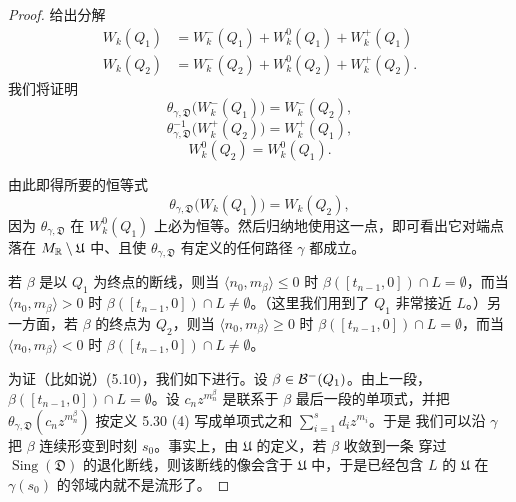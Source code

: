 \begin{proof}
给出分解
\begin{align*}
W_k(Q_1) &= W^-_k(Q_1)+W^0_k(Q_1)+W^+_k(Q_1)\\
W_k(Q_2) &= W^-_k(Q_2)+W^0_k(Q_2)+W^+_k(Q_2).
\end{align*}
我们将证明
\begin{equation}
\theta_{\gamma,\mathfrak D}\bigl(W^-_k(Q_1)\bigr) = W^-_k(Q_2), \tag{5.10}
\end{equation}
\begin{equation}
\theta^{-1}_{\gamma,\mathfrak D}\bigl(W^+_k(Q_2)\bigr) = W^+_k(Q_1), \tag{5.11}
\end{equation}
\begin{equation}
W^0_k(Q_2) = W^0_k(Q_1). \tag{5.12}
\end{equation}

由此即得所要的恒等式
\[
\theta_{\gamma,\mathfrak D}\bigl(W_k(Q_1)\bigr) = W_k(Q_2),
\]
因为 $\theta_{\gamma,\mathfrak D}$ 在 $W^0_k(Q_1)$ 上必为恒等。然后归纳地使用这一点，即可看出它对端点落在
$M_{\mathbb{R}}\setminus\mathfrak U$ 中、且使 $\theta_{\gamma,\mathfrak D}$ 有定义的任何路径 $\gamma$ 都成立。

若 $\beta$ 是以 $Q_1$ 为终点的断线，则当
$\langle n_0,m_\beta\rangle\le0$ 时 $\beta([t_{n-1},0])\cap L = \emptyset$，而当
$\langle n_0,m_\beta\rangle>0$ 时 $\beta([t_{n-1},0])\cap L\ne\emptyset$。（这里我们用到了 $Q_1$ 非常接近
$L$。）另一方面，若 $\beta$ 的终点为 $Q_2$，则当 $\langle n_0,m_\beta\rangle\ge0$ 时
$\beta([t_{n-1},0])\cap L = \emptyset$，而当 $\langle n_0,m_\beta\rangle<0$ 时
$\beta([t_{n-1},0])\cap L\ne\emptyset$。

为证（比如说）(5.10)，我们如下进行。设 $\beta\in\mathcal{B}^-(Q_1)$。由上一段，
$\beta([t_{n-1},0])\cap L = \emptyset$。设 $c_nz^{m^\beta_n}$ 是联系于 $\beta$ 最后一段的单项式，并把
$\theta_{\gamma,\mathfrak D}(c_nz^{m^\beta_n})$ 按定义 5.30 (4) 写成单项式之和 $\sum_{i=1}^s d_iz^{m_i}$。于是
我们可以沿 $\gamma$ 把 $\beta$ 连续形变到时刻 $s_0$。事实上，由 $\mathfrak U$ 的定义，若 $\beta$ 收敛到一条
穿过 $\operatorname{Sing}(\mathfrak D)$ 的退化断线，则该断线的像会含于 $\mathfrak U$ 中，于是已经包含 $L$
的 $\mathfrak U$ 在 $\gamma(s_0)$ 的邻域内就不是流形了。


\end{proof}
